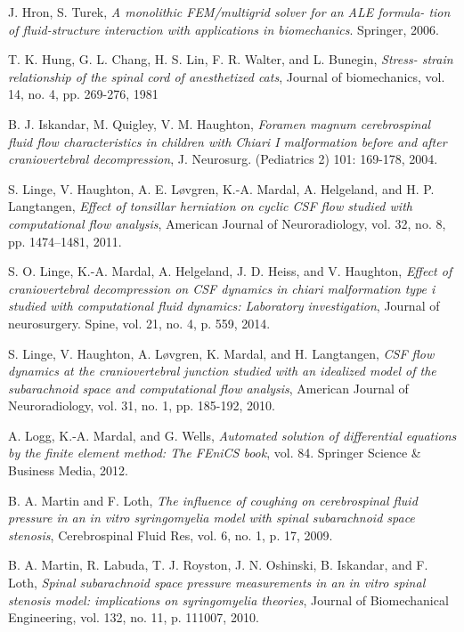 \documentclass[a4paper,11pt,openright,twoside]{book}
\begin{document}
\begin{thebibliography}{100}
 J. Hron, S. Turek, \emph{A monolithic FEM/multigrid solver for an ALE formula- tion of fluid-structure interaction with applications in biomechanics}. Springer, 2006.

 T. K. Hung, G. L. Chang, H. S. Lin, F. R. Walter, and L. Bunegin, \emph{Stress- strain relationship of the spinal cord of anesthetized cats}, Journal of biomechanics, vol. 14, no. 4, pp. 269-276, 1981

 B. J. Iskandar, M. Quigley, V. M. Haughton, \emph{Foramen magnum cerebrospinal fluid flow characteristics in children with Chiari I malformation before and after craniovertebral decompression}, J. Neurosurg. (Pediatrics 2) 101: 169-178, 2004.


  S. Linge, V. Haughton, A. E. Løvgren, K.-A. Mardal, A. Helgeland, and H. P. Langtangen, \emph{Effect of tonsillar herniation on cyclic CSF flow studied with computational flow analysis}, American Journal of Neuroradiology, vol. 32, no. 8, pp. 1474–1481, 2011.

 S. O. Linge, K.-A. Mardal, A. Helgeland, J. D. Heiss, and V. Haughton, \emph{Effect of craniovertebral decompression on CSF dynamics in chiari malformation type i studied with computational fluid dynamics: Laboratory investigation}, Journal of neurosurgery. Spine, vol. 21, no. 4, p. 559, 2014.

 S. Linge, V. Haughton, A. Løvgren, K. Mardal, and H. Langtangen, \emph{CSF flow dynamics at the craniovertebral junction studied with an idealized model of the subarachnoid space and computational flow analysis}, American Journal of Neuroradiology, vol. 31, no. 1, pp. 185-192, 2010.


 A. Logg, K.-A. Mardal, and G. Wells, \emph{Automated solution of differential equations by the finite element method: The FEniCS book}, vol. 84. Springer Science \& Business Media, 2012.


 B. A. Martin and F. Loth, \emph{The influence of coughing on cerebrospinal fluid pressure in an in vitro syringomyelia model with spinal subarachnoid space stenosis}, Cerebrospinal Fluid Res, vol. 6, no. 1, p. 17, 2009.

 B. A. Martin, R. Labuda, T. J. Royston, J. N. Oshinski, B. Iskandar, and F. Loth, \emph{Spinal subarachnoid space pressure measurements in an in vitro spinal stenosis model: implications on syringomyelia theories}, Journal of Biomechanical Engineering, vol. 132, no. 11, p. 111007, 2010.


\end{thebibliography}
\end{document}
